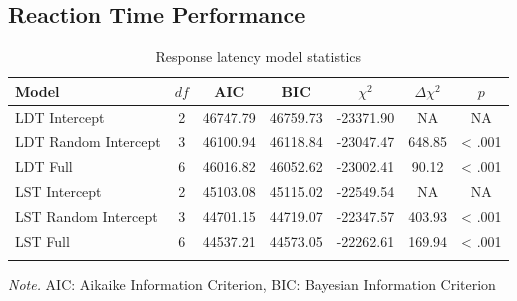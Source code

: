 \documentclass[english,man]{apa6}
\theoremstyle{definition}
\theoremstyle{definition}
\theoremstyle{definition}
\theoremstyle{remark}
\begin{document}
\subsection{Reaction Time Performance}\label{reaction-time-performance}

\begin{table}[tbp]
\begin{center}
\begin{threeparttable}
\caption{\label{tab:RT-table-model}Response latency model statistics}
\begin{tabular}{lcccccc}
\toprule
Model & $df$ & AIC & BIC & $\chi^2$ & $\Delta\chi^2$ & $p$\\
\midrule
LDT Intercept & 2 & 46747.79 & 46759.73 & -23371.90 & NA & NA\\
LDT Random Intercept & 3 & 46100.94 & 46118.84 & -23047.47 & 648.85 & < .001\\
LDT Full & 6 & 46016.82 & 46052.62 & -23002.41 & 90.12 & < .001\\
LST Intercept & 2 & 45103.08 & 45115.02 & -22549.54 & NA & NA\\
LST Random Intercept & 3 & 44701.15 & 44719.07 & -22347.57 & 403.93 & < .001\\
LST Full & 6 & 44537.21 & 44573.05 & -22262.61 & 169.94 & < .001\\
\bottomrule
\addlinespace
\end{tabular}
\begin{tablenotes}[para]
\textit{Note.} AIC: Aikaike Information Criterion, BIC: Bayesian Information Criterion
\end{tablenotes}
\end{threeparttable}
\end{center}
\end{table}
\end{document}
